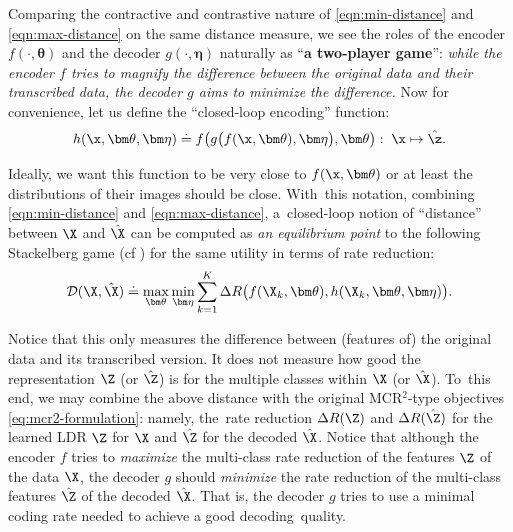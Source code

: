 \documentclass[../../book-main.tex]{subfiles}
\begin{document}
Comparing the contractive and contrastive nature of \eqref{eqn:min-distance} and \eqref{eqn:max-distance} on the same distance measure, we see the roles of the encoder $f(\cdot, \bm \theta)$ and the decoder $g(\cdot, \bm \eta)$ naturally as ``{\bf a  two-player game}'': {\em while the encoder $f$ tries to magnify the difference between the original data and their transcribed data, the decoder $g$ aims to minimize the difference.} Now for convenience, let us define the ``closed-loop encoding'' function:
\begin{equation}
    h(\x, \bm \theta,\bm \eta) \doteq f\big(g\big(f(\x, \bm \theta), \bm \eta\big), \bm \theta\big): \; \x \mapsto \hat \z.
\end{equation}

Ideally, we want this function to be very close to $f(\x, \bm \theta)$ or at least the distributions of their images should be close. With~this notation, combining \eqref{eqn:min-distance} and \eqref{eqn:max-distance}, a~closed-loop notion of ``distance'' between $\X$ and $\hat \X$ can be computed as {\em an equilibrium point} to the following Stackelberg game (cf ) for the same utility in terms of rate reduction:%
\begin{equation}
\mathcal{D}(\X, \hat \X) \doteq  \max_{\bm \theta} \min_{\bm \eta} \sum_{k=1}^K \Delta R\big(f(\X_k,\bm \theta), h(\X_k,\bm \theta,\bm \eta)\big).
    \label{eq:MCR2-GAN-pair}
\end{equation}

Notice that this only measures the difference between (features of) the original data and its transcribed version. It does not measure how good the representation $\Z$ (or $\hat \Z$) is for the multiple classes within $\X$ (or $\hat \X$). To~this end, we may combine the above distance with the original MCR$^2$-type objectives  \eqref{eq:mcr2-formulation}: namely, the~rate reduction $\Delta R(\Z)$ and $\Delta R(\hat \Z)$ for the learned LDR $\Z$ for $\X$ and $\hat \Z$ for the decoded $\hat \X$. Notice that although the encoder $f$ tries to {\em maximize} the multi-class rate reduction of the features $\Z$ of the data $\X$,  the decoder $g$ should {\em minimize} the rate reduction of the multi-class  features $\hat \Z$ of the decoded $\hat \X$. That is, the decoder $g$ tries to use a minimal  coding rate needed to achieve a good decoding~quality. 
\end{document}
